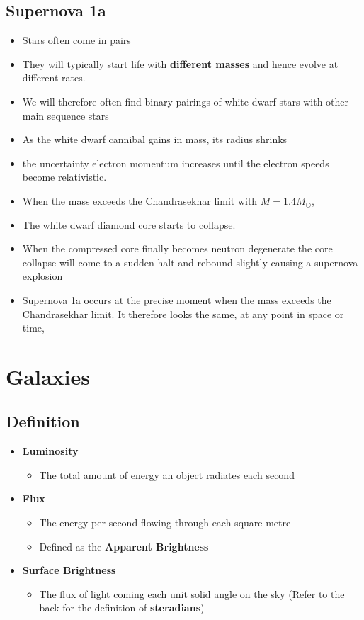 \documentclass{article}
\begin{document}
\subsection{Supernova 1a}
\begin{itemize}
    \item Stars often come in pairs
    \item They will typically start life with \textbf{different masses} and hence evolve at different rates.
    \item We will therefore often find binary pairings of white dwarf stars with other main sequence stars
    \item  As the white dwarf cannibal gains in mass, its
radius shrinks 
    \item the uncertainty electron momentum increases until the electron
speeds become relativistic.
    \item When the mass exceeds the Chandrasekhar limit with $M = 1.4M_\odot$,
    \item The white dwarf diamond core starts to collapse. \item When the compressed core finally becomes neutron degenerate the core collapse will come to a sudden halt and rebound slightly causing a supernova explosion
    \item Supernova 1a occurs at the precise moment when the mass exceeds the Chandrasekhar limit. It therefore looks the same, at any point in space or time,
\end{itemize}
\section{Galaxies}
\subsection{Definition}
\begin{itemize}
\item \textbf{Luminosity}
\begin{itemize}
\item The total amount of energy an object radiates each second
\end{itemize}
\item \textbf{Flux}
\begin{itemize}
\item The energy per second flowing through each square metre
\item Defined as the \textbf{Apparent Brightness}
\end{itemize}
\item \textbf{Surface Brightness }
\begin{itemize}
\item The flux of light coming each unit solid angle on the sky (Refer to the back for the definition of \textbf{steradians})
\end{itemize}
\end{itemize}
\end{document}
